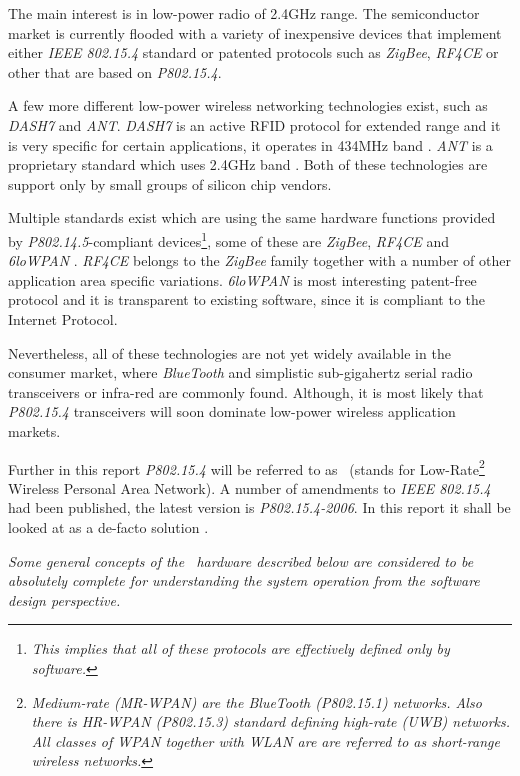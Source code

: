   The main interest is in low-power radio of 2.4GHz range. The semiconductor
 market is currently flooded with a variety of inexpensive devices that
 implement either \emph{IEEE 802.15.4} standard or patented protocols such
 as \emph{ZigBee}, \emph{RF4CE} or other that are based on \emph{P802.15.4}.

 A few more different low-power wireless networking technologies exist, such
 as \emph{DASH7} and \emph{ANT}. \emph{DASH7} is an active RFID protocol for
 extended range and it is very specific for certain applications, it operates
 in 434MHz band \cite{links:wiki:p:dash7}. \emph{ANT} is a proprietary standard
 which uses 2.4GHz band \cite{links:wiki:p:ant}. Both of these technologies
 are support only by small groups of silicon chip vendors.

 Multiple standards exist which are using the same hardware functions provided
 by \emph{P802.14.5}-compliant devices\footnote{\emph{This implies that all of
 these protocols are effectively defined only by software.}}, some of these are
 \emph{ZigBee}, \emph{RF4CE} and \emph{6loWPAN} \cite{links:wiki:p:6lowpan}.
 \emph{RF4CE} belongs to the \emph{ZigBee} \cite{links:wiki:p:zigbee} family
 together with a number of other application area specific variations.
 \emph{6loWPAN} \cite{links:wiki:p:6lowpan} is most interesting patent-free
 protocol and it is transparent to existing software, since it is compliant
 to the Internet Protocol. %

  Nevertheless, all of these technologies are not yet widely available in
 the consumer market, where \emph{BlueTooth} \cite{links:wiki:p:mrwpan} and
 simplistic sub-gigahertz serial radio transceivers or infra-red are commonly
 found. Although, it is most likely that \emph{P802.15.4} transceivers will
 soon dominate low-power wireless application markets.

 Further in this report \emph{P802.15.4} will be referred to as \WPAN\ 
 (stands for Low-Rate\footnote{\emph{Medium-rate (MR-WPAN) are the BlueTooth
 (P802.15.1) networks. Also there is HR-WPAN (P802.15.3) standard defining
 high-rate (UWB) networks. All classes of WPAN together with WLAN are
 are referred to as short-range wireless networks.}} Wireless Personal
 Area Network). A number of amendments to \emph{IEEE 802.15.4} had been
 published, the latest version is \emph{P802.15.4-2006}. In this report
 it shall be looked at as a de-facto solution \cite{links:wiki:p:wpan,
 links:wiki:p:lrwpan, links:ieee:802:15}.

 \emph{Some general concepts of the \WPAN\ hardware described below
 are considered to be absolutely complete for understanding the
 system operation from the software design perspective.}

